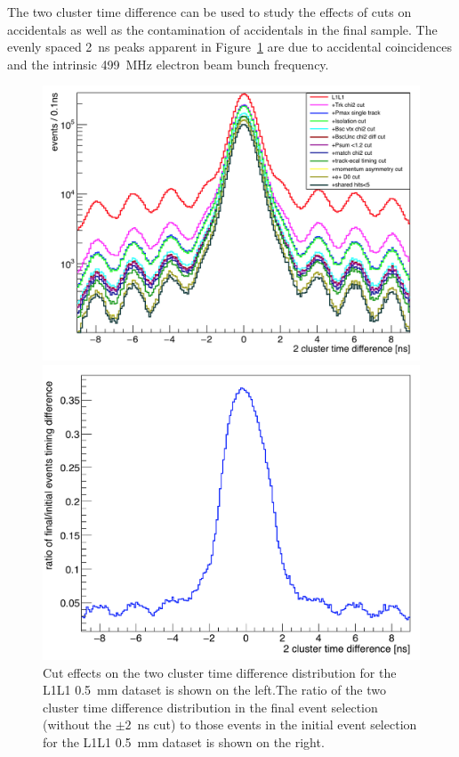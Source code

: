The two cluster time difference can be used to study the effects of cuts on accidentals as well as the contamination of accidentals in the final sample. The evenly spaced 2~ns peaks apparent in Figure~\ref{fig:l1l1_tdiff} are due to accidental coincidences and the intrinsic 499~MHz electron beam bunch frequency.
\begin{figure}[hbt]
\begin{minipage}{0.45\textwidth}
\includegraphics[width=\textwidth]{pics/searching/L1L1_tdiff.png}
\end{minipage}\hfill\begin{minipage}{0.45\textwidth}
 \includegraphics[width=\textwidth]{pics/searching/ratio_tdiff_cuts.png}
 \end{minipage}
 \caption[Cut effects on the time difference between two clusters]{Cut effects on the two cluster time difference distribution for the L1L1 0.5~mm dataset is shown on the left.The ratio of the two cluster time difference distribution in the final event selection (without the $\pm2$~ns cut) to those events in the initial event selection for the L1L1 0.5~mm dataset is shown on the right.}
  \label{fig:l1l1_tdiff}
\end{figure}
